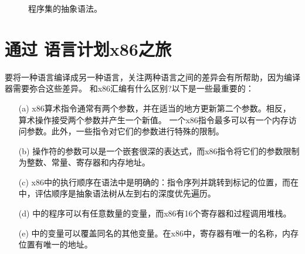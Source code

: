 \documentclass[11pt]{book}
\begin{document}
\begin{figure}[tp]
\caption{\LangXInt{} 程序集的抽象语法。}
\label{fig:x86-int-ast}
\end{figure}

\section{通过 \LangCVar{} 语言计划x86之旅}
\label{sec:plan-s0-x86}

要将一种语言编译成另一种语言，关注两种语言之间的差异会有所帮助，因为编译器需要弥合这些差异。 \LangVar{}
和x86汇编有什么区别?以下是一些最重要的：

\begin{enumerate}
\item[(a)]x86算术指令通常有两个参数，并在适当的地方更新第二个参数。相反， \LangVar{} 算术操作接受两个参数并产生一个新值。
  一个x86指令最多可以有一个内存访问参数。此外，一些指令对它们的参数进行特殊的限制。

\item[(b)]  \LangVar{} 操作符的参数可以是一个嵌套很深的表达式，而x86指令将它们的参数限制为整数、常量、寄存器和内存地址。

\item[(c)] x86中的执行顺序在语法中是明确的：指令序列并跳转到标记的位置，而在
  \LangVar{} 中，评估顺序是抽象语法树从左到右的深度优先遍历。

\item[(d)] \LangVar{} 中的程序可以有任意数量的变量，而x86有16个寄存器和过程调用堆栈。

\item[(e)] \LangVar{} 中的变量可以覆盖同名的其他变量。在x86中，寄存器有唯一的名称，内存位置有唯一的地址。
\end{enumerate}
\end{document}
